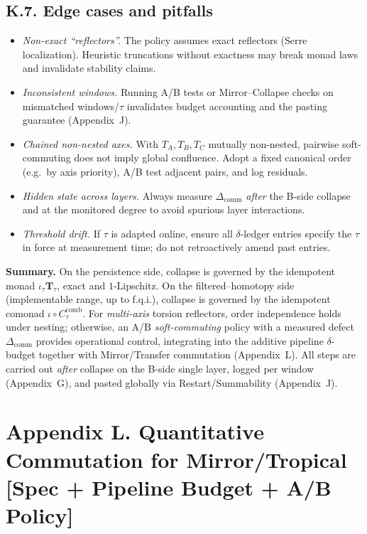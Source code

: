 \documentclass[11pt]{article}
\numberwithin{equation}{section}
\theoremstyle{plain}
\theoremstyle{definition}
\theoremstyle{remark}
\DeclareRobustCommand{\hyp}{\nobreakdash-}
\theoremstyle{plain}
\theoremstyle{definition}
\numberwithin{equation}{section}
\theoremstyle{definition}
\numberwithin{equation}{section}
\theoremstyle{plain}
\theoremstyle{definition}
\theoremstyle{remark}
\begin{document}
\subsection*{K.7. Edge cases and pitfalls}
\begin{itemize}\itemsep0.2em
  \item \emph{Non\hyp exact ``reflectors''.} The policy assumes exact reflectors (Serre localization). Heuristic truncations without exactness may break monad laws and invalidate stability claims.
  \item \emph{Inconsistent windows.} Running A/B tests or Mirror–Collapse checks on mismatched windows/\(\tau\) invalidates budget accounting and the pasting guarantee (Appendix~J).
  \item \emph{Chained non\hyp nested axes.} With \(T_A,T_B,T_C\) mutually non\hyp nested, pairwise soft\hyp commuting does not imply global confluence. Adopt a fixed canonical order (e.g.\ by axis priority), A/B test adjacent pairs, and log residuals.
  \item \emph{Hidden state across layers.} Always measure \(\Delta_{\mathrm{comm}}\) \emph{after} the B\hyp side collapse and at the monitored degree to avoid spurious layer interactions.
  \item \emph{Threshold drift.} If \(\tau\) is adapted online, ensure all \(\delta\)\hyp ledger entries specify the \(\tau\) in force at measurement time; do not retroactively amend past entries.
\end{itemize}

\medskip
\noindent\textbf{Summary.}
On the persistence side, collapse is governed by the idempotent monad \(\iota_\tau\mathbf{T}_\tau\), exact and \(1\)\hyp Lipschitz.
On the filtered–homotopy side (implementable range, up to f.q.i.), collapse is governed by the idempotent comonad \(\iota\circ C_\tau^{\mathrm{comb}}\).
For \emph{multi\hyp axis} torsion reflectors, order independence holds under nesting; otherwise, an A/B \emph{soft\hyp commuting} policy with a measured defect \(\Delta_{\mathrm{comm}}\) provides operational control, integrating into the additive pipeline \(\delta\)\hyp budget together with Mirror/Transfer commutation (Appendix~L).
All steps are carried out \emph{after} collapse on the B\hyp side single layer, logged per window (Appendix~G), and pasted globally via Restart/Summability (Appendix~J).



\section*{Appendix L. Quantitative Commutation for Mirror/Tropical [Spec + Pipeline Budget + A/B Policy]}
{}
\label{L:quant-comm}
\end{document}
